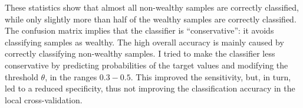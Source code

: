 These statistics show that almost all non-wealthy samples are correctly classified, while only slightly more than half of the wealthy samples are correctly classified. The confusion matrix implies that the classifier is ``conservative'': it avoids classifying samples as wealthy. The high overall accuracy is mainly caused by correctly classifying non-wealthy samples. I tried to make the classifier less conservative by predicting probabilities of the target values and modifying the threshold $\theta$, in the ranges $0.3 - 0.5$. This improved the sensitivity, but, in turn, led to a reduced specificity, thus not improving the classification accuracy in the local cross-validation.